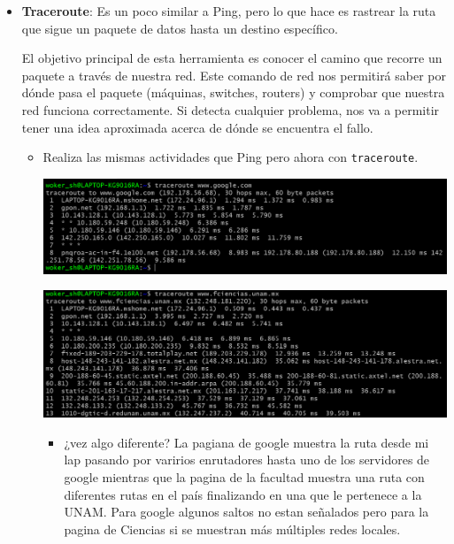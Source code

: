 \begin{itemize}
    \item \textbf{Traceroute}: Es un poco similar a Ping, pero lo que hace es rastrear la ruta que sigue un paquete de datos hasta un destino específico.

        El objetivo principal de esta herramienta es conocer el camino que recorre un paquete a través de nuestra red.
         Este comando de red nos permitirá saber por dónde pasa el paquete (máquinas, switches, routers) y 
         comprobar que nuestra red funciona correctamente. Si detecta cualquier problema, nos va a permitir tener 
         una idea aproximada acerca de dónde se encuentra el fallo. \cite{Pandora2024}

    \begin{itemize}
        \item Realiza las mismas actividades que Ping pero ahora con \texttt{traceroute}.
        
        \includegraphics[scale = .3]{IMAGE/Ejercicio2/T01.png}

        \includegraphics[scale = .3]{IMAGE/Ejercicio2/T02.png}
        
        \begin{itemize}
            \item ¿vez algo diferente?
            La pagiana de google muestra la ruta desde mi lap pasando por varirios enrutadores hasta uno 
            de los servidores de google mientras que la pagina de la facultad muestra una ruta con diferentes 
            rutas en el país finalizando en una que le pertenece a la UNAM. Para google algunos saltos no 
            estan señalados pero para la pagina de Ciencias si se muestran más múltiples redes locales.
        \end{itemize}



\end{itemize}
\end{itemize}
